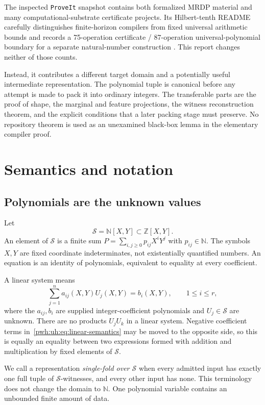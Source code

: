 \documentclass[11pt,letterpaper]{article}
\numberwithin{equation}{section}
\theoremstyle{definition}
\newcommand{\N}{\mathbb N}
\newcommand{\Z}{\mathbb Z}
\newcommand{\Sring}{\mathcal S}
\newcommand{\repo}{\texttt{ProveIt}}
\begin{document}
The inspected \repo{} snapshot contains both formalized MRDP material and
many computational-substrate certificate projects. Its Hilbert-tenth
README carefully distinguishes finite-horizon compilers from fixed
universal arithmetic bounds and records a 75-operation certificate /
87-operation universal-polynomial boundary for a separate natural-number
construction \cite{uh:ProveIt}. This report changes neither of those counts.

Instead, it contributes a different target domain and a potentially useful
intermediate representation. The polynomial tuple is canonical before
any attempt is made to pack it into ordinary integers. The transferable
parts are the proof of shape, the marginal and feature projections, the witness
reconstruction theorem, and the explicit conditions that a later packing
stage must preserve. No repository theorem is used as an unexamined
black-box lemma in the elementary compiler proof.

\section{Semantics and notation}
\label{pwh:uh:sec:semantics}

\subsection{Polynomials are the unknown values}

Let
\[
  \Sring=\N[X,Y]\subset\Z[X,Y].
\]
An element of $\Sring$ is a finite sum
$P=\sum_{i,j\ge0}p_{ij}X^iY^j$ with $p_{ij}\in\N$.
The symbols $X,Y$ are fixed coordinate indeterminates, not existentially
quantified numbers. An equation is an identity of polynomials, equivalent
to equality at every coefficient.

A linear system means
\begin{equation}
  \sum_{j=1}^n a_{ij}(X,Y)U_j(X,Y)=b_i(X,Y),
  \qquad 1\le i\le r,
  \label{pwh:uh:eq:linear-semantics}
\end{equation}
where the $a_{ij},b_i$ are supplied integer-coefficient polynomials and
$U_j\in\Sring$ are unknown. There are no products $U_jU_k$ in a linear
system. Negative coefficient terms in~\eqref{pwh:uh:eq:linear-semantics} may be
moved to the opposite side, so this is equally an equality between two
expressions formed with addition and multiplication by fixed elements
of $\Sring$.

We call a representation \emph{single-fold over $\Sring$} when every
admitted input has exactly one full tuple of $\Sring$-witnesses, and every
other input has none. This terminology does not change the domain to
$\N$. One polynomial variable contains an unbounded finite amount of data.
\end{document}
